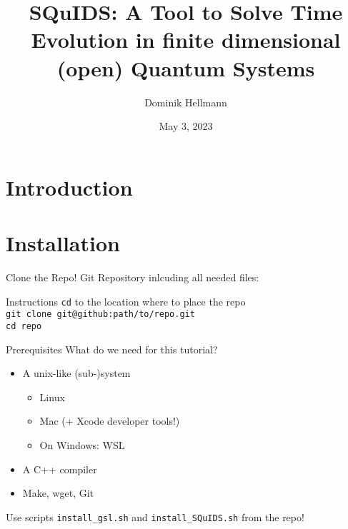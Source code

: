 \documentclass[]{beamer}
\title{\Large SQuIDS: A Tool to Solve Time Evolution in finite dimensional (open) Quantum Systems\\\vspace*{0.5cm}{\small An Application to Neutrino Oscillations\\\href{https://arxiv.org/abs/1412.3832.pdf}{arxiv:1412.3832}}}
\author{Dominik Hellmann}
\institute[TU Dortmund]{\scriptsize TU Dortmund\\WG Päs
}
\date{May 3, 2023}
\begin{document}
\nocite{*}


\frame{\titlepage}

\frame{\tableofcontents}

\section{Introduction}

\begin{frame}{}
  
\end{frame}

\begin{frame}{}
  
\end{frame}

\begin{frame}{}
  
\end{frame}

\begin{frame}{}
  
\end{frame}

\begin{frame}{}
  
\end{frame}

\begin{frame}{}
  
\end{frame}

\section{Installation}

\begin{frame}{Clone the Repo!}
  Git Repository inlcuding all needed files:
  \begin{block}{Instructions}
    \texttt{cd} to the location where to place the repo \\
    \texttt{git clone git@github:path/to/repo.git} \\
    \texttt{cd repo}
  \end{block}
\end{frame}

\begin{frame}{Prerequisites}
  What do we need for this tutorial?
  \begin{itemize}
    \item A unix-like (sub-)system 
    \begin{itemize}
      \item Linux
      \item Mac (+ Xcode developer tools!)
      \item On Windows: WSL
    \end{itemize}
    \item A C++ compiler
    \item Make, wget, Git
  \end{itemize}
  Use scripts \texttt{install\_gsl.sh} and \texttt{install\_SQuIDS.sh} from the repo!
\end{frame}
\end{document}
